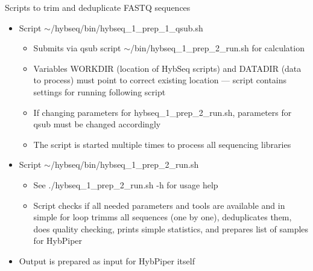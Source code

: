 \documentclass[compress,  xelatex, 11pt, xcolor=x11names, aspectratio=169,
	hyperref={
		bookmarks=true,
		unicode=true,
		colorlinks=true,
		pdftitle={HybSeq course},
		plainpages=false,
		pdfauthor={Vojtech Zeisek},
		pdfsubject={Practical processing of HybSeq target enrichment sequencing data on computing grids like MetaCentrum},
		pdfcreator={XeLaTeX},
		pdfkeywords={BASH, command line, GNU, HybSeq, Linux, MetaCentrum, sequencing shell, target enrichment},
		linkcolor=Turquoise4, %
		anchorcolor=DodgerBlue4, %
		citecolor=DodgerBlue4, %
		filecolor=DodgerBlue4, %
		menucolor=Tan4, %
		urlcolor=DarkOliveGreen4 %
		},
	url={hyphens, lowtilde} %
	]{beamer}
\renewcommand{\texttt}[1]{\colorbox{Cornsilk2}{{\ttfamily #1}}}
\begin{document}
\begin{frame}{Scripts to trim and deduplicate FASTQ sequences}
	\begin{itemize}
		\item Script \texttt{$\sim$/hybseq/bin/hybseq\_1\_prep\_1\_qsub.sh}
		\begin{itemize}
			\item Submits via \texttt{qsub} script \texttt{$\sim$/bin/hybseq\_1\_prep\_2\_run.sh} for calculation
			\item Variables \texttt{WORKDIR} (location of HybSeq scripts) and \texttt{DATADIR} (data to process) must point to correct existing location --- script contains settings for running following script
			\item If changing parameters for \texttt{hybseq\_1\_prep\_2\_run.sh}, parameters for \texttt{qsub} must be changed accordingly
			\item The script is started multiple times to process all sequencing libraries
		\end{itemize}
		\item Script \texttt{$\sim$/hybseq/bin/hybseq\_1\_prep\_2\_run.sh}
		\begin{itemize}
			\item See \texttt{./hybseq\_1\_prep\_2\_run.sh -h} for usage help
			\item Script checks if all needed parameters and tools are available and in simple \texttt{for} loop trimms all sequences (one by one), deduplicates them, does quality checking, prints simple statistics, and prepares list of samples for HybPiper
		\end{itemize}
		\item Output is prepared as input for HybPiper itself
	\end{itemize}
\end{frame}
\end{document}
